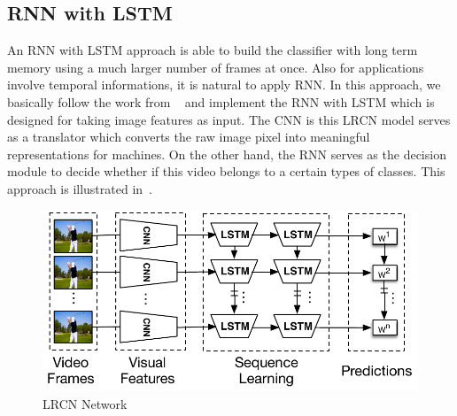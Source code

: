 

\subsection{RNN with LSTM}
An RNN with LSTM approach is able to build the classifier with long term memory using a much larger number of frames at once. 
Also for applications involve temporal informations, it is natural to apply RNN. In this approach, we basically follow the work from ~\cite{ltrcn} and implement the RNN with LSTM which is designed for taking image features as input. The CNN is this LRCN model serves as a translator which converts the raw image pixel into meaningful representations for machines. On the other hand, the RNN serves as the decision module to decide whether if this video belongs to a certain types of classes. 
This approach is illustrated in~.
\begin{figure}
  \centering
  \includegraphics[width=1.0\linewidth]{figs/lcrn}
  \caption{LRCN Network}
  \label{fig:lcrn}
\end{figure}


